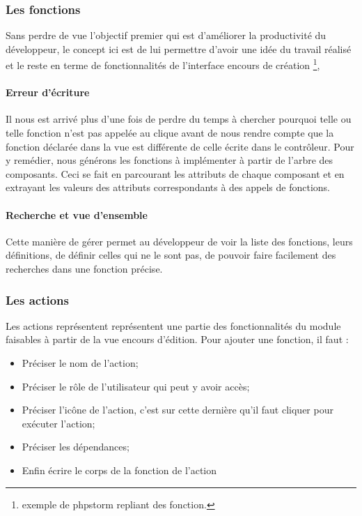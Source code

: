\documentclass[a4paper,12pt]{article}
\begin{document}
	

\subsubsection{ Les fonctions}
Sans perdre de vue l'objectif premier qui est d'améliorer la productivité du développeur,  le concept ici est de lui permettre
d'avoir une idée du travail réalisé et le reste en terme de fonctionnalités de l'interface encours de création \footnote{exemple de phpstorm  repliant des fonction.},
\paragraph{Erreur d'écriture}
 Il nous est arrivé plus d'une fois de perdre du temps à chercher pourquoi telle ou telle  fonction n'est pas appelée au clique avant de nous rendre compte que la fonction déclarée dans la vue est différente de celle écrite dans le contrôleur. Pour y remédier, nous générons les fonctions à implémenter à partir de l'arbre des composants. Ceci se fait en parcourant les attributs de chaque composant et en extrayant les valeurs des attributs correspondants  à des appels de fonctions.
\paragraph{Recherche et vue d'ensemble}
Cette manière de gérer permet au développeur de voir la liste des fonctions, leurs définitions, de définir celles qui ne le sont pas,  de pouvoir faire facilement des recherches dans une fonction précise.
\subsubsection{ Les actions}
Les actions représentent représentent une partie des fonctionnalités
du module faisables à partir de la vue encours d'édition.  Pour
ajouter une fonction, il faut :
\begin{itemize}
\item Préciser le nom de l'action;
\item  Préciser le rôle de l'utilisateur qui peut y avoir accès;
\item Préciser l'icône  de l'action, c'est sur cette dernière qu'il faut cliquer pour exécuter l'action;
\item Préciser les dépendances;
\item Enfin écrire le corps de la fonction de l'action
\end{itemize}
\end{document}
